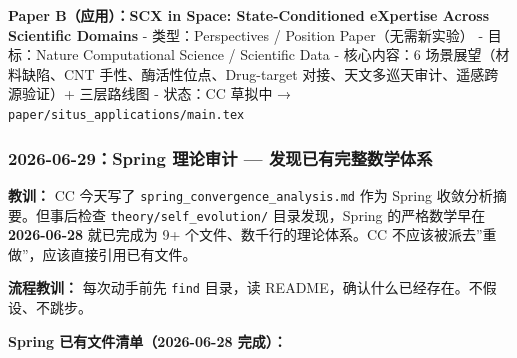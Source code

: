 \documentclass[
  12pt,
]{ctexart}
\begin{document}
\textbf{Paper B（应用）：SCX in Space: State-Conditioned eXpertise
Across Scientific Domains} - 类型：Perspectives / Position
Paper（无需新实验） - 目标：Nature Computational Science / Scientific
Data - 核心内容：6 场景展望（材料缺陷、CNT 手性、酶活性位点、Drug-target
对接、天文多巡天审计、遥感跨源验证）+ 三层路线图 - 状态：CC 草拟中 →
\texttt{paper/situs\_applications/main.tex}

\subsubsection{2026-06-29：Spring 理论审计 ---
发现已有完整数学体系}\label{spring-ux7406ux8bbaux5ba1ux8ba1-ux53d1ux73b0ux5df2ux6709ux5b8cux6574ux6570ux5b66ux4f53ux7cfb}

\textbf{教训：} CC 今天写了 \texttt{spring\_convergence\_analysis.md}
作为 Spring 收敛分析摘要。但事后检查 \texttt{theory/self\_evolution/}
目录发现，Spring 的严格数学早在 \textbf{2026-06-28} 就已完成为 9+
个文件、数千行的理论体系。CC
不应该被派去''重做''，应该直接引用已有文件。

\textbf{流程教训：} 每次动手前先 \texttt{find} 目录，读
README，确认什么已经存在。不假设、不跳步。

\textbf{Spring 已有文件清单（2026-06-28 完成）：}
\end{document}
